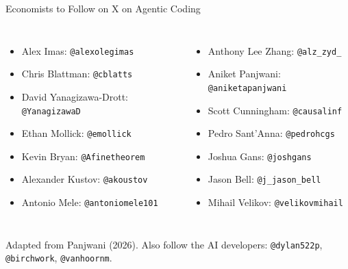 \documentclass[aspectratio=169, 11pt]{beamer}
\begin{document}
\begin{frame}{Economists to Follow on X on Agentic Coding}
\begin{columns}[T]
\begin{itemize}
  \item Alex Imas: \texttt{@alexolegimas}
  \item Chris Blattman: \texttt{@cblatts}
  \item David Yanagizawa-Drott: \texttt{@YanagizawaD}
  \item Ethan Mollick: \texttt{@emollick}
  \item Kevin Bryan: \texttt{@Afinetheorem}
  \item Alexander Kustov: \texttt{@akoustov}
  \item Antonio Mele: \texttt{@antoniomele101}
\end{itemize}

\begin{itemize}
  \item Anthony Lee Zhang: \texttt{@alz\_zyd\_}
  \item Aniket Panjwani: \texttt{@aniketapanjwani}
  \item Scott Cunningham: \texttt{@causalinf}
  \item Pedro Sant'Anna: \texttt{@pedrohcgs}
  \item Joshua Gans: \texttt{@joshgans}
  \item Jason Bell: \texttt{@j\_jason\_bell}
  \item Mihail Velikov: \texttt{@velikovmihail}
\end{itemize}
\end{columns}
\vspace{0.5cm}
\begin{center}
\small\textcolor{medgray}{Adapted from Panjwani (2026). Also follow the AI developers: \texttt{@dylan522p}, \texttt{@birchwork}, \texttt{@vanhoornm}.}
\end{center}
\end{frame}
\end{document}
